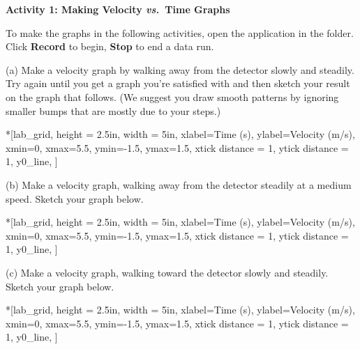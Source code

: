 \bigskip

\textbf{Activity 1: Making Velocity \textit{vs.}~Time Graphs} 

To make the graphs in the following activities, open the  application in the \filename{\coursefolder} folder. Click \textbf{Record} to begin, \textbf{Stop} to end a data run.

(a) Make a velocity graph by walking away from the detector slowly and steadily.
Try again until you get a graph you're satisfied with and then sketch your result
on the graph that follows. (We suggest you draw smooth patterns by ignoring
smaller bumps that are mostly due to your steps.)

\begin{lab_axis}*[lab_grid,
	height = {2.5in}, width = {5in},
	xlabel={Time (s)},
	ylabel={Velocity (m/s)},
	xmin=0, xmax=5.5,
	ymin=-1.5, ymax=1.5,
	xtick distance = 1,
	ytick distance = 1,
	y0_line,
	]
\end{lab_axis}

(b) Make a velocity graph, walking away from the detector steadily at a medium
speed. Sketch your graph below.

\begin{lab_axis}*[lab_grid,
	height = {2.5in}, width = {5in},
	xlabel={Time (s)},
	ylabel={Velocity (m/s)},
	xmin=0, xmax=5.5,
	ymin=-1.5, ymax=1.5,
	xtick distance = 1,
	ytick distance = 1,
	y0_line,
	]
\end{lab_axis}

(c) Make a velocity graph, walking toward the detector slowly and steadily.
Sketch your graph below.

\begin{lab_axis}*[lab_grid,
	height = {2.5in}, width = {5in},
	xlabel={Time (s)},
	ylabel={Velocity (m/s)},
	xmin=0, xmax=5.5,
	ymin=-1.5, ymax=1.5,
	xtick distance = 1,
	ytick distance = 1,
	y0_line,
	]
\end{lab_axis}

